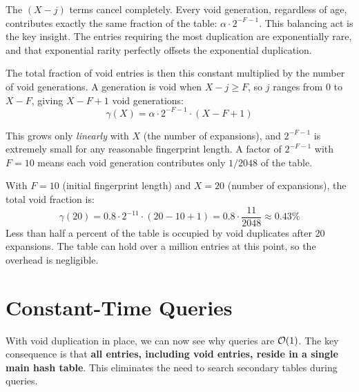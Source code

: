 The $(X - j)$ terms cancel completely. Every void generation, 
regardless of age, contributes exactly the same fraction of the 
table: $\alpha \cdot 2^{-F-1}$. This balancing act is the key insight. The 
entries requiring the most duplication are exponentially rare, and 
that exponential rarity perfectly offsets the exponential duplication.

The total fraction of void entries is then this constant multiplied 
by the number of void generations. A generation is void when 
$X - j \geq F$, so $j$ ranges from $0$ to $X - F$, giving 
$X - F + 1$ void generations:
\begin{equation}
  \gamma(X) = \alpha \cdot 2^{-F-1} \cdot (X - F + 1)
  \label{eq:total-void-fraction}
\end{equation}

This grows only \emph{linearly} with $X$ (the number of expansions), 
and $2^{-F-1}$ is extremely small for any reasonable fingerprint 
length. A factor of $2^{-F-1}$ with $F = 10$ means each void 
generation contributes only $1/2048$ of the table.

\begin{examplebox}
With $F = 10$ (initial fingerprint length) and $X = 20$ (number of 
expansions), the total void fraction is:
\[
  \gamma(20) = 0.8 \cdot 2^{-11} \cdot (20 - 10 + 1) 
  = 0.8 \cdot \frac{11}{2048} \approx 0.43\%
\]
Less than half a percent of the table is occupied by void duplicates 
after 20 expansions. The table can hold over a million entries at 
this point, so the overhead is negligible.
\end{examplebox}


\section{Constant-Time Queries}
\label{sec:constant-queries}

With void duplication in place, we can now see why queries are 
$\mathcal{O}(1)$. The key consequence is that \textbf{all entries, 
including void entries, reside in a single main hash table}. This 
eliminates the need to search secondary tables during queries.

